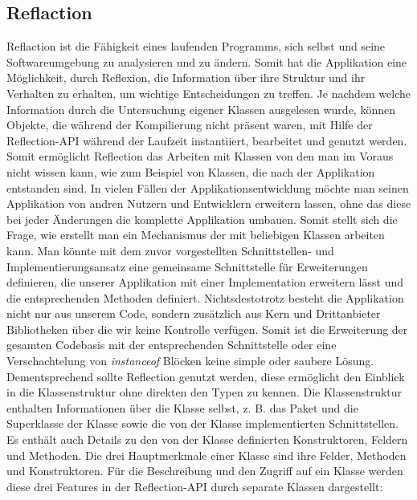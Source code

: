 \subsection{Reflaction} 
\label{sec:reflaction}
Reflaction ist die Fähigkeit eines laufenden Programms, sich selbst und seine Softwareumgebung zu analysieren und zu ändern. 
Somit hat die Applikation eine Möglichkeit, durch Reflexion, die Information über ihre Struktur und ihr Verhalten zu erhalten, um wichtige Entscheidungen zu treffen. \newline
Je nachdem welche Information durch die Untersuchung eigener Klassen ausgelesen wurde, können Objekte, die während der Kompilierung nicht präsent waren, mit Hilfe der Reflection-API während der Laufzeit instantiiert, bearbeitet und genutzt werden. Somit ermöglicht Reflection das Arbeiten mit Klassen von den man im Voraus nicht wissen kann, wie zum Beispiel von Klassen, die nach der Applikation entstanden sind.
\bigbreak
In vielen Fällen der Applikationsentwicklung möchte man seinen Applikation von andren Nutzern und Entwicklern erweitern lassen, ohne das diese bei jeder Änderungen die komplette Applikation umbauen. 
Somit stellt sich die Frage, wie erstellt man ein Mechanismus der mit beliebigen Klassen arbeiten kann.
Man könnte mit dem zuvor vorgestellten Schnittstellen- und Implementierungsansatz eine gemeinsame Schnittstelle für Erweiterungen definieren, die unserer Applikation mit einer Implementation erweitern lässt und die entsprechenden Methoden definiert. 
Nichtsdestotrotz besteht die Applikation nicht nur aus unserem Code, sondern zusätzlich aus Kern und Drittanbieter Bibliotheken über die wir keine Kontrolle verfügen.
Somit ist die Erweiterung der gesamten Codebasis mit der entsprechenden Schnittstelle oder eine Verschachtelung von \textit{instanceof} Blöcken keine simple oder saubere Lösung. 
Dementsprechend sollte Reflection genutzt werden, diese ermöglicht den Einblick in die Klassenstruktur ohne direkten den Typen zu kennen. Die Klassenstruktur enthalten Informationen über die Klasse selbst, z. B. das Paket und die Superklasse der Klasse sowie die von der Klasse implementierten Schnittstellen. Es enthält auch Details zu den von der Klasse definierten Konstruktoren, Feldern und Methoden. \bigbreak
Die drei Hauptmerkmale einer Klasse sind ihre Felder, Methoden und Konstruktoren. 
Für die Beschreibung und den Zugriff auf ein Klasse werden diese drei Features in der Reflection-API durch separate Klassen dargestellt: 
